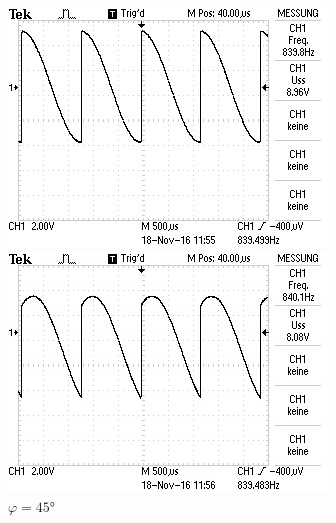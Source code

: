 \begin{figure}[!h]
\begin{minipage}[t]{0.3\textwidth}
\includegraphics[width=\textwidth]{Bilder/15.jpg}
\caption{$\varphi = 15\si{\degree}$}
\label{fig:1}
\end{minipage}
\hspace{10pt}
\vspace{5pt}
\begin{minipage}[t]{0.3\textwidth}
\includegraphics[width=\textwidth]{Bilder/45.jpg}
\caption{$\varphi = 45\si{\degree}$}
\label{fig:2}
\end{minipage}
\hspace{10pt}
\vspace{5pt}
\begin{minipage}[t]{0.3\textwidth}

\end{minipage}
\end{figure}
